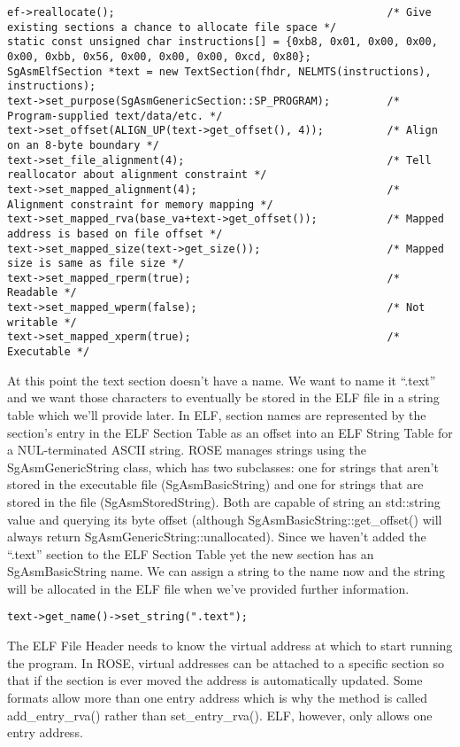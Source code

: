 \begin{verbatim}
ef->reallocate();                                           /* Give existing sections a chance to allocate file space */
static const unsigned char instructions[] = {0xb8, 0x01, 0x00, 0x00, 0x00, 0xbb, 0x56, 0x00, 0x00, 0x00, 0xcd, 0x80};
SgAsmElfSection *text = new TextSection(fhdr, NELMTS(instructions), instructions);
text->set_purpose(SgAsmGenericSection::SP_PROGRAM);         /* Program-supplied text/data/etc. */
text->set_offset(ALIGN_UP(text->get_offset(), 4));          /* Align on an 8-byte boundary */
text->set_file_alignment(4);                                /* Tell reallocator about alignment constraint */
text->set_mapped_alignment(4);                              /* Alignment constraint for memory mapping */
text->set_mapped_rva(base_va+text->get_offset());           /* Mapped address is based on file offset */
text->set_mapped_size(text->get_size());                    /* Mapped size is same as file size */
text->set_mapped_rperm(true);                               /* Readable */
text->set_mapped_wperm(false);                              /* Not writable */
text->set_mapped_xperm(true);                               /* Executable */
\end{verbatim}

At this point the text section doesn't have a name. We want to name it
``.text'' and we want those characters to eventually be stored in the
ELF file in a string table which we'll provide later. In ELF, section
names are represented by the section's entry in the ELF Section Table
as an offset into an ELF String Table for a NUL-terminated ASCII
string. ROSE manages strings using the SgAsmGenericString class, which
has two subclasses: one for strings that aren't stored in the
executable file (SgAsmBasicString) and one for strings that are stored
in the file (SgAsmStoredString). Both are capable of string an
std::string value and querying its byte offset (although
SgAsmBasicString::get_offset() will always return
SgAsmGenericString::unallocated).  Since we haven't added the
``.text'' section to the ELF Section Table yet the new section has an
SgAsmBasicString name. We can assign a string to the name now and the
string will be allocated in the ELF file when we've provided further
information.

\begin{verbatim}
text->get_name()->set_string(".text");
\end{verbatim}

The ELF File Header needs to know the virtual address at which to
start running the program. In ROSE, virtual addresses can be attached
to a specific section so that if the section is ever moved the address
is automatically updated. Some formats allow more than one entry
address which is why the method is called add_entry_rva() rather than
set_entry_rva(). ELF, however, only allows one entry address.


